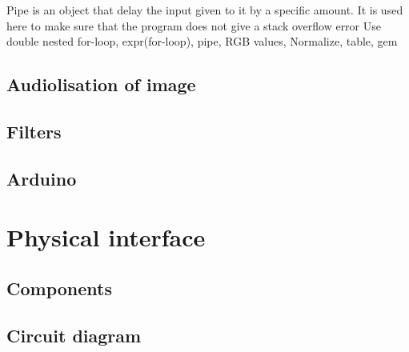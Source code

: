 	Pipe is an object that delay the input given to it by a specific amount. It is used here to make sure that the program does not give a stack overflow error
	Use double nested for-loop, expr(for-loop), pipe, RGB values, Normalize, table, gem

	\subsection{Audiolisation of image}\label{sub:audiolisationofimage} 

	\subsection{Filters}\label{sub:filters}
	
	\subsection{Arduino}\label{sub:arduino}
	
\section{Physical interface}\label{sec:physicalinterface}
	\subsection{Components}\label{sub:components}
	
	\subsection{Circuit diagram}\label{sub:circuitdiagram}